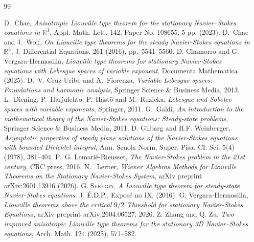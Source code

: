 \documentclass[a4paper,12pt]{amsart}
\theoremstyle{definition}
\theoremstyle{plain}
\def\R{\mathbb{R}}
\def\R{\mathbb R}
\begin{document}
\begin{thebibliography}{99}
%

{\sc D.~Chae}, {\em Anisotropic Liouville type theorem for the stationary Navier–Stokes
equations in $\R^3$}, 
Appl. Math. Lett. 142, Paper No. 108655, 5 pp. (2023).
%
{\sc D.~Chae and J.~Wolf}, {\em On {L}iouville type theorems for the steady
  {N}avier-{S}tokes equations in {$\mathbb{R}^3$}}, J. Differential Equations,
  261 (2016), pp.~5541--5560.
%
 {\sc D. Chamorro and  G. Vergara-Hermosilla}, {\em  Liouville type theorems for stationary Navier-Stokes equations with Lebesgue spaces of variable exponent}, Documenta Mathematica (2025).
%
{\sc D.~V. Cruz-Uribe and A.~Fiorenza}, {\em Variable {L}ebesgue spaces:
Foundations and harmonic analysis}, Springer Science \& Business Media, 2013.
%
{\sc L.~Diening, P.~Harjulehto, P.~H{\"a}st{\"o} and M.~Ruzicka}, {\em
Lebesgue and Sobolev spaces with variable exponents}, Springer, 2011.
%
{\sc G.~Galdi}, {\em An introduction to the mathematical theory of the
{N}avier-{S}tokes equations: Steady-state problems}, Springer Science \&
Business Media, 2011.
%
{\sc D. Gilbarg and  H.F.  Weinberger}, {\em Asymptotic properties of steady plane solutions
of the Navier-Stokes equations with bounded Dirichlet integral}, Ann. Scuola
Norm. Super. Pisa. CI. Sci. 5(4)  (1978), 381–404.
%
{\sc P.~G. Lemari{\'e}-Rieusset},
{\em The {N}avier-{S}tokes problem in the 21st century}, CRC press, 2016.
%
%
{\sc N.~
Lerner},   {\em Wiener Algebras Methods for Liouville Theorems on the Stationary Navier-Stokes System}, arXiv preprint arXiv:2601.13916  (2026).
%
\textsc{G. Seregin}, \emph{A Liouville type theorem for steady-state Navier-Stokes equations}.  
J. {\'E}.D.P., Expos{\'e} no IX, (2016).
%
 {\sc G. Vergara-Hermosilla}, \emph{Liouville theorems above the critical $9/2$ Threshold for stationary Navier-Stokes Equations}, arXiv preprint arXiv:2604.06527, 2026.
%
 {\sc  Z. Zhang and  Q. Zu}, 
  {\em Two improved anisotropic Liouville type theorems for the stationary 3D Navier–Stokes equations}, 
Arch. Math. 124 (2025), 571–582.

\end{thebibliography}

 
\end{document}
